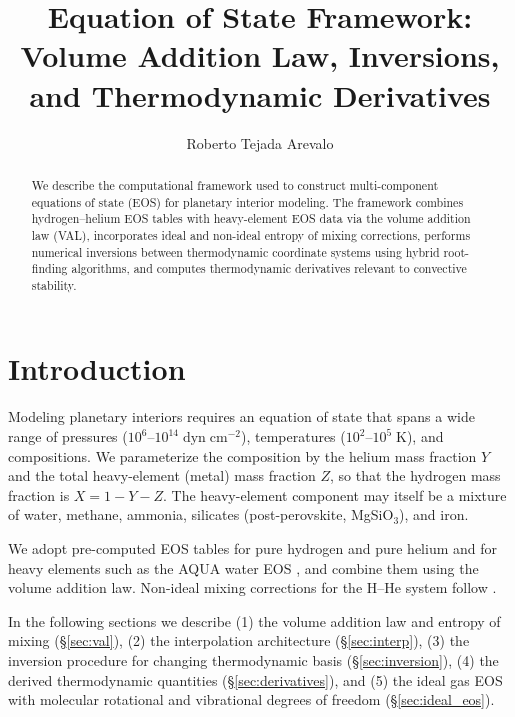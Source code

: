 \documentclass[twocolumn]{aastex701}
\begin{document}
\title{Equation of State Framework: Volume Addition Law, Inversions, and Thermodynamic Derivatives}

\author{Roberto Tejada Arevalo}

\begin{abstract}
We describe the computational framework used to construct multi-component equations of state (EOS) for planetary interior modeling.
The framework combines hydrogen--helium EOS tables with heavy-element EOS data via the volume addition law (VAL), incorporates ideal and non-ideal entropy of mixing corrections, performs numerical inversions between thermodynamic coordinate systems using hybrid root-finding algorithms, and computes thermodynamic derivatives relevant to convective stability.
\end{abstract}


\section{Introduction}\label{sec:intro}

Modeling planetary interiors requires an equation of state that spans a wide range of pressures ($10^{6}$--$10^{14}\;\mathrm{dyn\;cm^{-2}}$), temperatures ($10^{2}$--$10^{5}\;\mathrm{K}$), and compositions.
We parameterize the composition by the helium mass fraction $Y$ and the total heavy-element (metal) mass fraction $Z$, so that the hydrogen mass fraction is $X = 1 - Y - Z$.
The heavy-element component may itself be a mixture of water, methane, ammonia, silicates (post-perovskite, MgSiO$_3$), and iron.

We adopt pre-computed EOS tables for pure hydrogen and pure helium \citep[e.g.,][]{Chabrier2019,Chabrier2021} and for heavy elements such as the AQUA water EOS \citep{Haldemann2020}, and combine them using the volume addition law.
Non-ideal mixing corrections for the H--He system follow \citet{Howard2023a}.

In the following sections we describe (1) the volume addition law and entropy of mixing (\S\ref{sec:val}), (2) the interpolation architecture (\S\ref{sec:interp}), (3) the inversion procedure for changing thermodynamic basis (\S\ref{sec:inversion}), (4) the derived thermodynamic quantities (\S\ref{sec:derivatives}), and (5) the ideal gas EOS with molecular rotational and vibrational degrees of freedom (\S\ref{sec:ideal_eos}).
\end{document}
